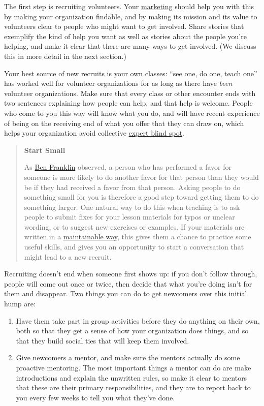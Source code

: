 \documentclass[10pt,statementpaper]{memoir}
\begin{document}
The first step is recruiting volunteers. Your
\href{marketing.html}{marketing} should help you with this by making
your organization findable, and by making its mission and its value to
volunteers clear to people who might want to get involved. Share stories
that exemplify the kind of help you want as well as stories about the
people you're helping, and make it clear that there are many ways to get
involved. (We discuss this in more detail in the next section.)

Your best source of new recruits is your own classes: ``see one, do one,
teach one'' has worked well for volunteer organizations for as long as
there have \emph{been} volunteer organizations. Make sure that every
class or other encounter ends with two sentences explaining how people
can help, and that help is welcome. People who come to you this way will
know what you do, and will have recent experience of being on the
receiving end of what you offer that they can draw on, which helps your
organization avoid collective
\href{gloss.html\#expert-blind-spot}{expert blind spot}.

\begin{quote}
\textbf{Start Small}

As \href{https://en.wikipedia.org/wiki/Ben_Franklin_effect}{Ben
Franklin} observed, a person who has performed a favor for someone is
more likely to do another favor for that person than they would be if
they had received a favor from that person. Asking people to do
something small for you is therefore a good step toward getting them to
do something larger. One natural way to do this when teaching is to ask
people to submit fixes for your lesson materials for typos or unclear
wording, or to suggest new exercises or examples. If your materials are
written in a \href{lessons.html\#maintainability}{maintainable way},
this gives them a chance to practice some useful skills, and gives you
an opportunity to start a conversation that might lead to a new recruit.
\end{quote}

Recruiting doesn't end when someone first shows up: if you don't follow
through, people will come out once or twice, then decide that what
you're doing isn't for them and disappear. Two things you can do to get
newcomers over this initial hump are:

\begin{enumerate}
\def\labelenumi{\arabic{enumi}.}
\item
  Have them take part in group activities before they do anything on
  their own, both so that they get a sense of how your organization does
  things, and so that they build social ties that will keep them
  involved.
\item
  Give newcomers a mentor, and make sure the mentors actually do some
  proactive mentoring. The most important things a mentor can do are
  make introductions and explain the unwritten rules, so make it clear
  to mentors that these are their primary responsibilities, and they are
  to report back to you every few weeks to tell you what they've done.
\end{enumerate}
\end{document}
